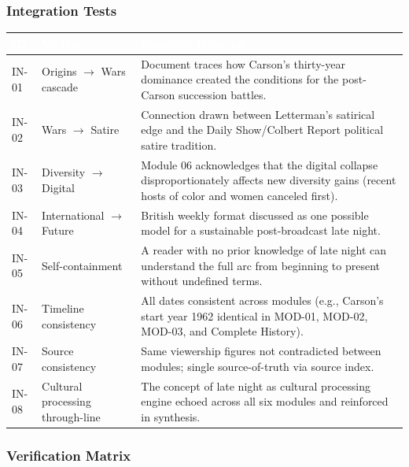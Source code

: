 \documentclass[11pt,letterpaper]{article}
\newcommand{\tableheader}[1]{\textbf{\sffamily\textcolor{white}{#1}}}
\begin{document}
\subsubsection{Integration Tests}

\begin{center}
\begin{tabularx}{\textwidth}{C{1.2cm}L{3cm}X}
\toprule
{}
\tableheader{ID} & \tableheader{Verifies} & \tableheader{Expected Behavior} \\
\midrule
IN-01 & Origins $\to$ Wars cascade & Document traces how Carson's thirty-year dominance created the conditions for the post-Carson succession battles. \\
IN-02 & Wars $\to$ Satire & Connection drawn between Letterman's satirical edge and the Daily Show/Colbert Report political satire tradition. \\
IN-03 & Diversity $\to$ Digital & Module 06 acknowledges that the digital collapse disproportionately affects new diversity gains (recent hosts of color and women canceled first). \\
IN-04 & International $\to$ Future & British weekly format discussed as one possible model for a sustainable post-broadcast late night. \\
IN-05 & Self-containment & A reader with no prior knowledge of late night can understand the full arc from beginning to present without undefined terms. \\
IN-06 & Timeline consistency & All dates consistent across modules (e.g., Carson's start year 1962 identical in MOD-01, MOD-02, MOD-03, and Complete History). \\
IN-07 & Source consistency & Same viewership figures not contradicted between modules; single source-of-truth via source index. \\
IN-08 & Cultural processing through-line & The concept of late night as cultural processing engine echoed across all six modules and reinforced in synthesis. \\
\bottomrule
\end{tabularx}
\end{center}

\subsubsection{Verification Matrix}
\end{document}
